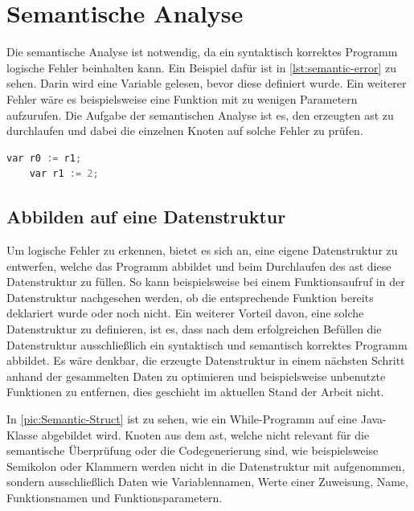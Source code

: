 \chapter{Semantische Analyse} \label{chap:semantic}

Die semantische Analyse ist notwendig, da ein syntaktisch korrektes Programm logische Fehler beinhalten kann. Ein Beispiel dafür ist in \cref{lst:semantic-error} zu sehen. Darin wird eine Variable gelesen, bevor diese definiert wurde. Ein weiterer Fehler wäre es beispielsweise eine Funktion mit zu wenigen Parametern aufzurufen. Die Aufgabe der semantischen Analyse ist es, den erzeugten \ac{ast} zu durchlaufen und dabei die einzelnen Knoten auf solche Fehler zu prüfen.

\begin{lstlisting}[language=c, caption=Beispiel für einen semantischen Fehler, label={lst:semantic-error}]
	var r0 := r1;
	var r1 := 2;
\end{lstlisting}

\section{Abbilden auf eine Datenstruktur}
Um logische Fehler zu erkennen, bietet es sich an, eine eigene Datenstruktur zu entwerfen, welche das Programm abbildet und beim Durchlaufen des \ac{ast} diese Datenstruktur zu füllen. So kann beispielsweise bei einem Funktionsaufruf in der Datenstruktur nachgesehen werden, ob die entsprechende Funktion bereits deklariert wurde oder noch nicht. Ein weiterer Vorteil davon, eine solche Datenstruktur zu definieren, ist es, dass nach dem erfolgreichen Befüllen die Datenstruktur ausschließlich ein syntaktisch und semantisch korrektes Programm abbildet. Es wäre denkbar, die erzeugte Datenstruktur in einem nächsten Schritt anhand der gesammelten Daten zu optimieren und beispielsweise unbenutzte Funktionen zu entfernen, dies geschieht im aktuellen Stand der Arbeit nicht.

In \cref{pic:Semantic-Struct} ist zu sehen, wie ein While-Programm auf eine Java-Klasse abgebildet wird. Knoten aus dem \ac{ast}, welche nicht relevant für die semantische Überprüfung oder die Codegenerierung sind, wie beispielsweise Semikolon oder Klammern werden nicht in die Datenstruktur mit aufgenommen, sondern ausschließlich Daten wie Variablennamen, Werte einer Zuweisung, Name, Funktionsnamen und Funktionsparametern.

